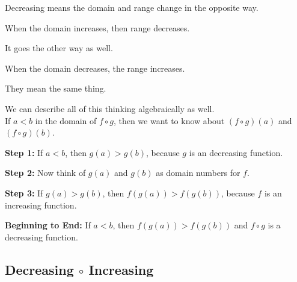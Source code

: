\documentclass{ximera}
\begin{document}
\begin{warning}

Decreasing means the domain and range change in the opposite way.

When the domain increases, then range decreases.

It goes the other way as well.

When the domain decreases, the range increases.

They mean the same thing.


\end{warning}






We can describe all of this thinking algebraically as well. \\


If $a < b$ in the domain of $f \circ g$, then we want to know about $(f \circ g)(a)$  and $(f \circ g)(b)$.



\textbf{Step 1:}  If $a < b$, then $g(a) > g(b)$, because $g$ is an decreasing function.


\textbf{Step 2:}  Now think of $g(a)$  and $g(b)$ as domain numbers for $f$.


\textbf{Step 3:}  If $g(a) > g(b)$, then $f(g(a)) > f(g(b))$, because $f$ is an increasing function.


\textbf{Beginning to End:} If $a < b$, then $f(g(a)) > f(g(b))$ and $f \circ g$ is a decreasing function.






































\subsection{Decreasing $\circ$ Increasing}
\end{document}
